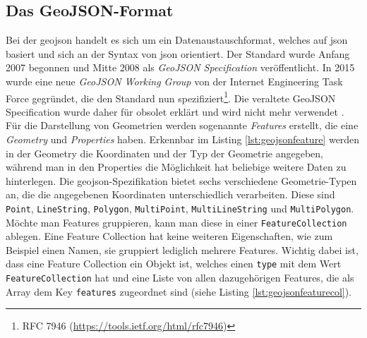 \subsection{Das GeoJSON-Format}
Bei der \ac{geojson} handelt es sich um ein Datenaustauschformat, welches auf \ac{json} basiert und sich an der Syntax von \ac{json} orientiert.
Der Standard wurde Anfang 2007 begonnen und Mitte 2008 als \emph{GeoJSON Specification} veröffentlicht.
In 2015 wurde eine neue \emph{GeoJSON Working Group} von der Internet Engineering Task Force gegründet, die den Standard nun spezifiziert\footnote{RFC 7946 (\url{https://tools.ietf.org/html/rfc7946})}.
Die veraltete GeoJSON Specification wurde daher für obsolet erklärt und wird nicht mehr verwendet \parencite{BUT2008}.\pbreak%
%
Für die Darstellung von Geometrien werden sogenannte \textit{Features} erstellt, die eine \textit{Geometry} und \textit{Properties} haben.
Erkennbar im Listing \ref{lst:geojsonfeature} werden in der Geometry die Koordinaten und der Typ der Geometrie angegeben, während man in den Properties die Möglichkeit hat beliebige weitere Daten zu hinterlegen.
Die \ac{geojson}-Spezifikation bietet sechs verschiedene Geometrie-Typen an, die die angegebenen Koordinaten unterschiedlich verarbeiten.
Diese sind \texttt{Point}, \texttt{LineString}, \texttt{Polygon}, \texttt{MultiPoint}, \texttt{MultiLineString} und \texttt{MultiPolygon}.
\pbreak
Möchte man Features gruppieren, kann man diese in einer \texttt{FeatureCollection} ablegen.
Eine Feature Collection hat keine weiteren Eigenschaften, wie zum Beispiel einen Namen, sie gruppiert lediglich mehrere Features.
Wichtig dabei ist, dass eine Feature Collection ein Objekt ist, welches einen \texttt{type} mit dem Wert \texttt{FeatureCollection} hat und eine Liste von allen dazugehörigen Features, die als Array dem Key \texttt{features} zugeordnet sind (siehe Listing \ref{lst:geojsonfeaturecol}).

